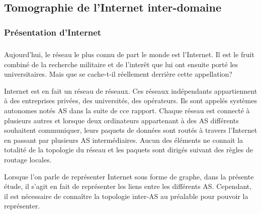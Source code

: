 
% 

\subsection{Tomographie de l'Internet inter-domaine}

\subsubsection{Pr\'esentation d'Internet}

\subparagraph{}
Aujourd'hui, le r\'eseau le plus connu de part le monde est l'Internet. Il est le fruit combin\'e de la recherche militaire et de l'inter\^et que lui ont ensuite port\'e les universitaires. Mais que se cache-t-il r\'eellement derri\`ere cette appellation?
\par
Internet est en fait un r\'eseau de r\'eseaux. Ces r\'eseaux ind\'ependants appartiennent \`a des entreprises priv\'ees, des universit\'es, des op\'erateurs. Ils sont appel\'es syst\`emes autonomes not\'es AS dans la suite de cce rapport. Chaque r\'eseau est connect\'e \`a plusieurs autres et lorsque deux ordinateurs appartenant \`a des AS diff\'erents souhaitent communiquer, leurs paquets de donn\'ees sont rout\'es \`a travers l'Internet en passant par plusieurs AS interm\'ediaires. Aucun des \'el\'ements ne connait la totalit\'e de la topologie du r\'eseau et les paquets sont dirig\'es suivant des r\`egles de routage locales.
\par
Lorsque l'on parle de repr\'esenter Internet sous forme de graphe, dans la pr\'esente \'etude, il s'agit en fait de repr\'esenter les liens entre les diff\'erents AS. Cependant, il est n\'ecessaire de connaître la topologie inter-AS au pr\'ealable pour pouvoir la repr\'esenter.

